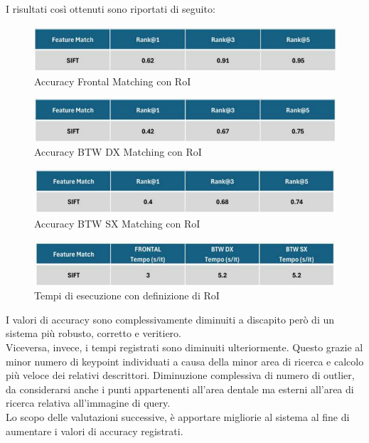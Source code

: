 \documentclass[12pt,a4paper,openright,twoside]{book}
\begin{document}
I risultati così ottenuti sono riportati di seguito:
\begin{figure}[H]
	\centering
	\includegraphics{figures/frontal3.pdf}
   	\caption{Accuracy Frontal Matching con RoI}
	\label{fig:frontal3}
\end{figure}
\begin{figure}[H]
	\centering
	\includegraphics{figures/dx3.pdf}
    	\caption{Accuracy BTW DX Matching con RoI}
	\label{fig:dx3}
\end{figure}
\begin{figure}[H]
	\centering
	\includegraphics{figures/sx3.pdf}
    	\caption{Accuracy BTW SX Matching con RoI}
	\label{fig:sx3}
\end{figure}
\begin{figure}[H]
	\centering
	\includegraphics{figures/tempi3.pdf}
    	\caption{Tempi di esecuzione con definizione di RoI}
	\label{fig:tempi3}
\end{figure}

I valori di accuracy sono complessivamente diminuiti a discapito però di un sistema più robusto, corretto e veritiero.\\
Viceversa, invece, i tempi registrati sono diminuiti ulteriormente. Questo grazie al minor numero di keypoint individuati a causa della minor area di ricerca e calcolo più veloce dei relativi descrittori. Diminuzione complessiva di numero di outlier, da considerarsi anche i punti appartenenti all'area dentale ma esterni all'area di ricerca relativa all'immagine di query.\\
Lo scopo delle valutazioni successive, è apportare migliorie al sistema al fine di aumentare i valori di accuracy registrati.
\end{document}
